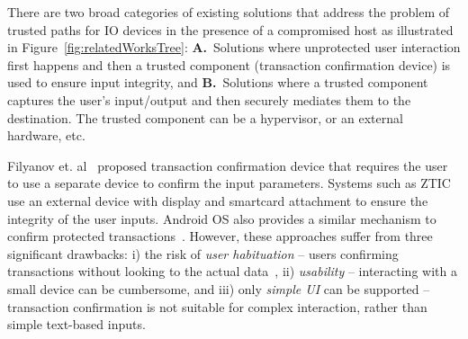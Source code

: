 There are two broad categories of existing solutions that address the problem of trusted paths for IO devices in the presence of a compromised host as illustrated in Figure~\ref{fig:relatedWorksTree}: \textbf{A.}~Solutions where unprotected user interaction first happens and then a trusted component (transaction confirmation device) is used to ensure input integrity,
and \textbf{B.}~Solutions where a trusted component captures the user's input/output and then securely mediates them to the destination. The trusted component can be a hypervisor, or an external hardware, etc. %

 Filyanov et. al~\cite{filyanov2011uni} proposed transaction confirmation device that requires the user to use a separate device to confirm the input parameters. Systems such as ZTIC~\cite{weigold2011secure} use an external device with display and smartcard attachment to ensure the integrity of the user inputs. Android OS also provides a similar mechanism to confirm protected transactions~\cite{android_confirm}. 
However, these approaches suffer from three significant drawbacks: i) the risk of \emph{user habituation} -- users confirming transactions without looking to the actual data~\cite{anderson2016warning},
ii) \emph{usability} -- interacting with a small device can be cumbersome, and iii) only \emph{simple UI} can be supported -- transaction confirmation is not suitable for complex interaction, rather than simple text-based inputs.


